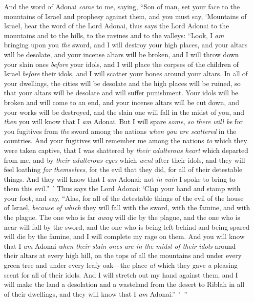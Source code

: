 \begin{biblechapter} %
 And the word of Adonai \textit{came} to me, saying,
\verse “Son of man, set your face to the mountains of Israel and prophesy against them,
\verse and you must say, ‘Mountains of Israel, hear the word of the Lord Adonai, thus says the Lord Adonai to the mountains and to the hills, to the ravines and to the valleys: “Look, I \textit{am} bringing upon you \textit{the} sword, and I will destroy your high places,
\verse and your altars will be desolate, and your incense altars will be broken, and I will throw down your slain ones \textit{before} your idols,
\verse and I will place the corpses of the children of Israel \textit{before} their idols, and I will scatter your bones around your altars.
\verse In all of your dwellings, the cities will be desolate and the high places will be ruined, so that your altars will be desolate and will suffer punishment. Your idols will be broken and will come to an end, and your incense altars will be cut down, and your works will be destroyed,
\verse and the slain one will fall in the midst of you, and \textit{then} you will know that I \textit{am} Adonai.
\verse But I will spare \textit{some}, \textit{so there will be} for you fugitives from \textit{the} sword among the nations \textit{when you are scattered} in the countries.
\verse And your fugitives will remember me among the nations \textit{to} which they were taken captive, that I was shattered by \textit{their adulterous heart} which departed from me, and by \textit{their adulterous eyes} which \textit{went} after their idols, and they will feel loathing \textit{for themselves}, for the evil that they did, for all of their detestable things.
\verse And they will know that I \textit{am} Adonai; not \textit{in vain} I spoke to bring to them this evil.” ’
\verse Thus says the Lord Adonai: ‘Clap your hand and stamp with your foot, and say, “Alas, for all of the detestable things of the evil of the house of Israel, \textit{because of which} they will fall with the sword, with the famine, and with the plague.
\verse The one who is far \textit{away} will die by the plague, and the one who is near will fall by the sword, and the one who is being left behind and being spared will die by the famine, and I will complete my rage on them.
\verse And you will know that I \textit{am} Adonai \textit{when their slain ones are in the midst of their idols} around their altars at every high hill, on the tops of all the mountains and under every green tree and under every leafy oak—the place \textit{at} which they gave \textit{a} pleasing scent for all of their idols.
\verse And I will stretch out my hand against them, and I will make the land a desolation and a wasteland from the desert to Riblah in all of their dwellings, and they will know that I \textit{am} Adonai.” ’ ”
\end{biblechapter}

